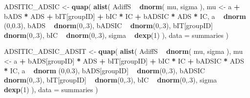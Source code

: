 \documentclass[10pt,dvipsnames,enabledeprecatedfontcommands]{scrartcl}
\newenvironment{Shaded}{\begin{snugshade}}{\end{snugshade}}
\newcommand{\KeywordTok}[1]{\textcolor[rgb]{0.13,0.29,0.53}{\textbf{#1}}}
\newcommand{\DataTypeTok}[1]{\textcolor[rgb]{0.13,0.29,0.53}{#1}}
\newcommand{\DecValTok}[1]{\textcolor[rgb]{0.00,0.00,0.81}{#1}}
\newcommand{\FloatTok}[1]{\textcolor[rgb]{0.00,0.00,0.81}{#1}}
\newcommand{\StringTok}[1]{\textcolor[rgb]{0.31,0.60,0.02}{#1}}
\newcommand{\OperatorTok}[1]{\textcolor[rgb]{0.81,0.36,0.00}{\textbf{#1}}}
\newcommand{\NormalTok}[1]{#1}
\begin{document}
\begin{Shaded}
\begin{Highlighting}[]
\NormalTok{ADSITIC_ADSIC <-}\StringTok{ }\KeywordTok{quap}\NormalTok{(}
  \KeywordTok{alist}\NormalTok{(}
\NormalTok{    AdiffS }\OperatorTok{~}\StringTok{ }\KeywordTok{dnorm}\NormalTok{( mu, sigma ),}
\NormalTok{    mu <-}\StringTok{ }\NormalTok{a }\OperatorTok{+}\StringTok{ }\NormalTok{bADS }\OperatorTok{*}\StringTok{ }\NormalTok{ADS }\OperatorTok{+}\StringTok{  }\NormalTok{bIT[groupID] }\OperatorTok{+}\StringTok{ }\NormalTok{bIC }\OperatorTok{*}\StringTok{ }\NormalTok{IC }\OperatorTok{+}\StringTok{ }\NormalTok{bADSIC }\OperatorTok{*}\StringTok{ }\NormalTok{ADS }\OperatorTok{*}\StringTok{ }\NormalTok{IC,}
\NormalTok{    a }\OperatorTok{~}\StringTok{ }\KeywordTok{dnorm}\NormalTok{ (}\DecValTok{0}\NormalTok{,}\FloatTok{0.3}\NormalTok{),}
\NormalTok{    bADS }\OperatorTok{~}\StringTok{ }\KeywordTok{dnorm}\NormalTok{(}\DecValTok{0}\NormalTok{,.}\DecValTok{3}\NormalTok{),}
\NormalTok{    bADSIC }\OperatorTok{~}\StringTok{ }\KeywordTok{dnorm}\NormalTok{(}\DecValTok{0}\NormalTok{,.}\DecValTok{3}\NormalTok{),}
\NormalTok{    bIT[groupID] }\OperatorTok{~}\StringTok{ }\KeywordTok{dnorm}\NormalTok{(}\DecValTok{0}\NormalTok{,.}\DecValTok{3}\NormalTok{),}
\NormalTok{    bIC }\OperatorTok{~}\StringTok{ }\KeywordTok{dnorm}\NormalTok{(}\DecValTok{0}\NormalTok{,.}\DecValTok{3}\NormalTok{),}
\NormalTok{    sigma  }\OperatorTok{~}\StringTok{ }\KeywordTok{dexp}\NormalTok{(}\DecValTok{1}\NormalTok{)}
\NormalTok{  ), }
  \DataTypeTok{data =}\NormalTok{ summaries}
\NormalTok{)}


\NormalTok{ADSITIC_ADSIC_ADSIT <-}\StringTok{ }\KeywordTok{quap}\NormalTok{(}
  \KeywordTok{alist}\NormalTok{(}
\NormalTok{    AdiffS }\OperatorTok{~}\StringTok{ }\KeywordTok{dnorm}\NormalTok{( mu, sigma ),}
\NormalTok{    mu <-}\StringTok{ }\NormalTok{a }\OperatorTok{+}\StringTok{ }\NormalTok{bADS[groupID] }\OperatorTok{*}\StringTok{ }\NormalTok{ADS }\OperatorTok{+}\StringTok{  }\NormalTok{bIT[groupID] }\OperatorTok{+}\StringTok{ }\NormalTok{bIC }\OperatorTok{*}\StringTok{ }\NormalTok{IC }\OperatorTok{+}\StringTok{ }\NormalTok{bADSIC }\OperatorTok{*}\StringTok{ }\NormalTok{ADS }\OperatorTok{*}\StringTok{ }\NormalTok{IC,}
\NormalTok{    a }\OperatorTok{~}\StringTok{ }\KeywordTok{dnorm}\NormalTok{ (}\DecValTok{0}\NormalTok{,}\FloatTok{0.3}\NormalTok{),}
\NormalTok{    bADS[groupID] }\OperatorTok{~}\StringTok{ }\KeywordTok{dnorm}\NormalTok{(}\DecValTok{0}\NormalTok{,.}\DecValTok{3}\NormalTok{),}
\NormalTok{    bADSIC }\OperatorTok{~}\StringTok{ }\KeywordTok{dnorm}\NormalTok{(}\DecValTok{0}\NormalTok{,.}\DecValTok{3}\NormalTok{),}
\NormalTok{    bIT[groupID] }\OperatorTok{~}\StringTok{ }\KeywordTok{dnorm}\NormalTok{(}\DecValTok{0}\NormalTok{,.}\DecValTok{3}\NormalTok{),}
\NormalTok{    bIC }\OperatorTok{~}\StringTok{ }\KeywordTok{dnorm}\NormalTok{(}\DecValTok{0}\NormalTok{,.}\DecValTok{3}\NormalTok{),}
\NormalTok{    sigma  }\OperatorTok{~}\StringTok{ }\KeywordTok{dexp}\NormalTok{(}\DecValTok{1}\NormalTok{)}
\NormalTok{  ), }
  \DataTypeTok{data =}\NormalTok{ summaries}
\NormalTok{)}



\end{Highlighting}
\end{Shaded}
\end{document}
